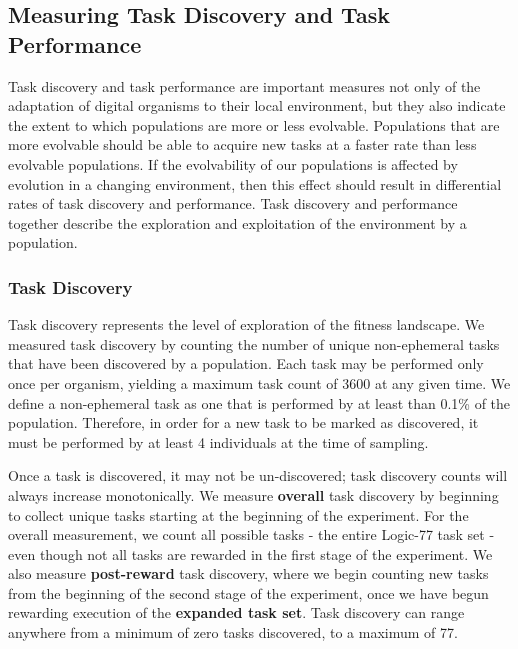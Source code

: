 \documentclass[10pt,letterpaper]{article}
\begin{document}
\subsection*{Measuring Task Discovery and Task Performance}
Task discovery and task performance are important measures not only of the adaptation of digital organisms to their local environment, but they also indicate the extent to which populations are more or less evolvable. Populations that are more evolvable should be able to acquire new tasks at a faster rate than less evolvable populations. If the evolvability of our populations is affected by evolution in a changing environment, then this effect should result in differential rates of task discovery and performance. Task discovery and performance together describe the exploration and exploitation of the environment by a population. 

\subsubsection*{Task Discovery}
Task discovery represents the level of exploration of the fitness landscape. We measured task discovery by counting the number of unique non-ephemeral tasks that have been discovered by a population. Each task may be performed only once per organism, yielding a maximum task count of 3600 at any given time. We define a non-ephemeral task as one that is performed by at least than 0.1\% of the population. 
Therefore, in order for a new task to be marked as discovered, it must be performed by at least 4 individuals at the time of sampling.

Once a task is discovered, it may not be un-discovered; task discovery counts will always increase monotonically. We measure \textbf{overall} task discovery by beginning to collect unique tasks starting at the beginning of the experiment. For the overall measurement, we count all possible tasks - the entire Logic-77 task set - even though not all tasks are rewarded in the first stage of the experiment. We also measure \textbf{post-reward} task discovery, where we begin counting new tasks from the beginning of the second stage of the experiment, once we have begun rewarding execution of the \textbf{expanded task set}. 
Task discovery can range anywhere from a minimum of zero tasks discovered, to a maximum of 77.
\end{document}
